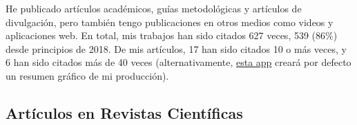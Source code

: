 \documentclass[11pt,a4paper,]{awesome-cv}
\begin{document}
\begin{footnotesize}
He publicado artículos académicos, guías metodológicas y artículos de divulgación, pero también tengo publicaciones en otros medios como videos y aplicaciones web. En total, mis trabajos han sido citados 627 veces, 539 (86\%) desde principios de 2018. De mis artículos, 17 han sido citados 10 o más veces, y 6 han sido citados más de 40 veces (alternativamente, \href{https://shiny.jdl-svr.lat/ScholarlyOutput_ES/}{esta app} creará por defecto un resumen gráfico de mi producción).
\end{footnotesize}

\hypertarget{artuxedculos-en-revistas-cientuxedficas}{%
\subsection{Artículos en Revistas
Científicas}\label{artuxedculos-en-revistas-cientuxedficas}}
\end{document}
